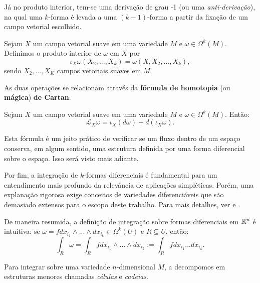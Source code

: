 Já no produto interior, tem-se uma derivação de grau -1 (ou uma \textit{anti-derivação}), na qual uma $k$-forma é levada a uma $(k-1)$-forma a partir da fixação de um campo vetorial escolhido.

\begin{definition}
    Sejam $X$ um campo vetorial suave em uma variedade $M$ e $\omega \in \Omega^k(M)$. Definimos o produto interior de $\omega$ em $X$ por
    \begin{equation*}
        \iota_X \omega (X_2, ..., X_k) = \omega(X, X_2, ..., X_k),
    \end{equation*}
    sendo $X_2, ..., X_K$ campos vetoriais suaves em $M$.
\end{definition}

As duas operações se relacionam através da \textbf{fórmula de homotopia} (ou \textbf{mágica}) \textbf{de Cartan}.

\begin{theorem}\label{teorema:formula_magica_cartan}\citep[230]{Tu2010-sb}
    Sejam $X$ um campo vetorial suave em uma variedade $M$ e $\omega \in \Omega^k(M)$. Então:
    \begin{equation*}
        \mathcal L_X \omega = \iota_X (d \omega) + d (\iota_X \omega).
    \end{equation*}
\end{theorem}

Esta fórmula é um jeito prático de verificar se um fluxo dentro de um espaço conserva, em algum sentido, uma estrutura definida por uma forma diferencial sobre o espaço. Isso será visto mais adiante.

Por fim, a integração de $k$-formas diferenciais é fundamental para um entendimento mais profundo da relevância de aplicações simpléticas. Porém, uma explanação rigorosa exige conceitos de variedades diferenciáveis que são demasiado extensos para o escopo deste trabalho. Para mais detalhes, ver \cite{Tu2010-sb} e \cite{Arnold2013-bs}.

De maneira resumida, a definição de integração sobre formas diferenciais em $\mathbb{R}^n$ é intuitiva: se $\omega = f dx_{i_1} \wedge ... \wedge dx_{i_k} \in \Omega^k (U)$ e $R \subseteq U$, então:
\begin{equation*}
    \int_R \omega 
    = \int_R f dx_{i_1} \wedge ... \wedge dx_{i_k} 
    := \int_R f dx_{i_1} ... dx_{i_k}.
\end{equation*}

Para integrar sobre uma variedade $n$-dimensional $M$, a decompomos em estruturas menores chamadas \textit{células} e \textit{cadeias}.

